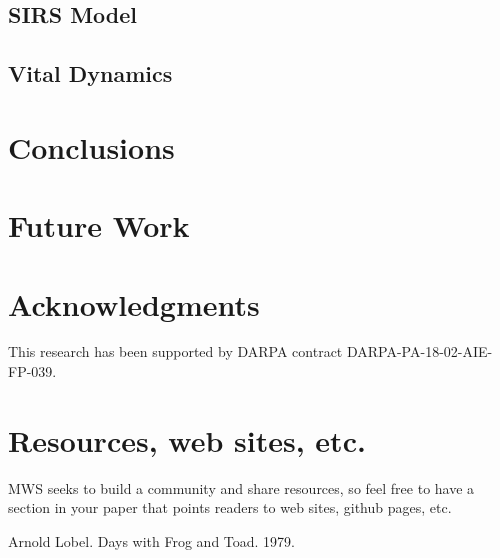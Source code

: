 \documentclass[11pt]{article}
\begin{document}
\subsection{SIRS Model}

\subsection{Vital Dynamics}

\section{Conclusions}

\section{Future Work}

\section{Acknowledgments}

This research has been supported by DARPA contract DARPA-PA-18-02-AIE-FP-039.

\section{Resources, web sites, etc.}

MWS seeks to build a community and share resources, so feel free to have a section in your paper that points readers to web sites, github pages, etc.


\begin{thebibliography}{9}

Arnold Lobel.  Days with Frog and Toad. 1979.


\end{thebibliography}
\end{document}
